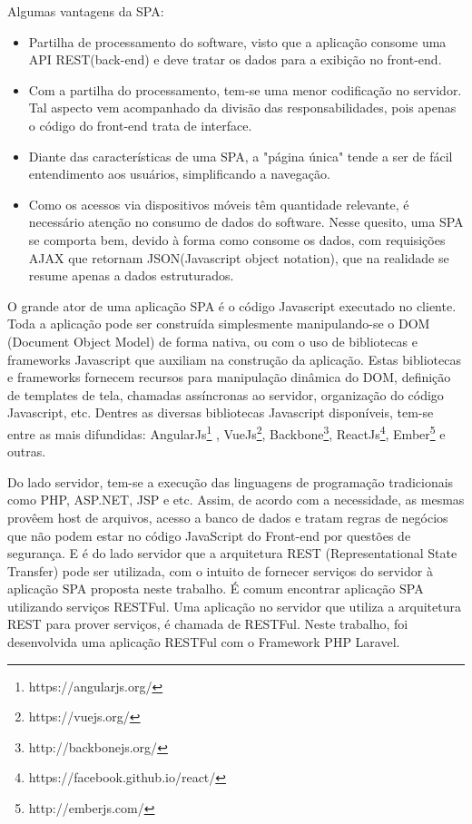 Algumas vantagens da SPA:
\begin{itemize}

\item Partilha de processamento do software, visto que a aplicação consome uma API REST(back-end) e deve tratar os dados para a exibição no front-end.

\item Com a partilha do processamento, tem-se uma menor codificação no servidor. Tal aspecto vem acompanhado da divisão das responsabilidades, pois apenas o código do front-end trata de interface.

\item Diante das características de uma SPA, a "página única" tende a ser de fácil entendimento aos usuários, simplificando a navegação.

\item Como os acessos via dispositivos móveis têm quantidade relevante, é necessário atenção no consumo de dados do software. Nesse quesito, uma SPA se comporta bem, devido à forma como consome os dados, com requisições AJAX que retornam JSON(Javascript object notation), que na realidade se resume apenas a dados estruturados.

\end{itemize}
O grande ator de uma aplicação SPA é o código Javascript executado no cliente. Toda a aplicação pode ser construída simplesmente manipulando-se o DOM (Document Object Model) de forma nativa, ou com o uso de bibliotecas e frameworks Javascript que auxiliam na construção da aplicação. Estas bibliotecas e frameworks fornecem recursos para manipulação dinâmica do DOM, definição de templates de tela, chamadas assíncronas ao servidor, organização do código Javascript, etc. Dentres as diversas bibliotecas Javascript disponíveis, tem-se entre as mais difundidas: AngularJs\footnote{https://angularjs.org/}
, VueJs\footnote{https://vuejs.org/}, Backbone\footnote{http://backbonejs.org/}, ReactJs\footnote{https://facebook.github.io/react/}, Ember\footnote{http://emberjs.com/} e outras.


Do lado servidor, tem-se a execução das linguagens de programação tradicionais como PHP, ASP.NET, JSP e etc. Assim, de acordo com a necessidade, as mesmas provêem host de arquivos, acesso a banco de dados e tratam regras de negócios que não podem estar no código JavaScript do Front-end por questões de segurança. E é do lado servidor que a arquitetura REST (Representational State Transfer) pode ser utilizada, com o intuito de fornecer serviços do servidor à aplicação SPA proposta neste trabalho. É comum encontrar aplicação SPA utilizando serviços RESTFul. Uma aplicação no servidor que utiliza a arquitetura REST para prover serviços, é chamada de RESTFul. Neste trabalho, foi desenvolvida uma aplicação RESTFul com o Framework PHP Laravel.


